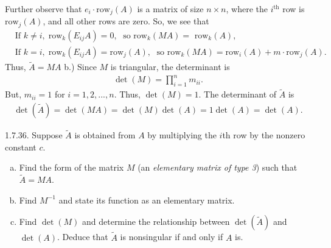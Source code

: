 \documentclass{report}
\begin{document}
    Further observe that $e_{i} \cdot \text{row}_{j}(A)$ is a matrix of size $n\times n$, where the $i^{\text{th}} $ row is $\text{row}_{j}(A)$, and all other rows are zero.
    \bigbreak \noindent 
    So, we see that 
    \begin{align*}
        &\text{If } k \ne i,\; \text{row}_{k}(E_{ij}A) = 0, \; \text{ so } \text{row}_{k}(MA) = \text{ row}_{k}(A), \\
        &\text{If } k = i,\; \text{row}_{k}(E_{ij}A) = \text{row}_{j}(A), \; \text{ so } \text{row}_{k}(MA) = \text{row}_{i}(A) + m \cdot  \text{row}_{j}(A)
    .\end{align*}
    Thus, $\tilde{A} = MA$
    \bigbreak \noindent 
    b.) Since $M$ is triangular, the determinant is
    \begin{align*}
        \det(M) = \prod_{i=1}^{n} m_{ii}
    .\end{align*}
    But, $m_{ii} = 1$ for $i=1,2,...,n$. Thus, $\det(M) = 1$. The determinant of $\tilde{A}$ is 
    \begin{align*}
        \det(\tilde{A}) = \det(MA)= \det(M)\det(A) = 1\det(A) = \det(A)
    .\end{align*}


            \bigbreak \noindent 
    \begin{mdframed}
        1.7.36. Suppose $\tilde{A}$ is obtained from $A$ by multiplying the $i$th row by the nonzero constant $c$.
        \begin{enumerate}[(a)]
            \item Find the form of the matrix $M$ (an \textit{elementary matrix of type 3}) 
                such that $\tilde{A} = M A$.

            \item Find $M^{-1}$ and state its function as an elementary matrix.

            \item Find $\det(M)$ and determine the relationship between $\det(\tilde{A})$ 
                and $\det(A)$. Deduce that $\tilde{A}$ is nonsingular if and only if $A$ is.
        \end{enumerate}
    \end{mdframed}
\end{document}
